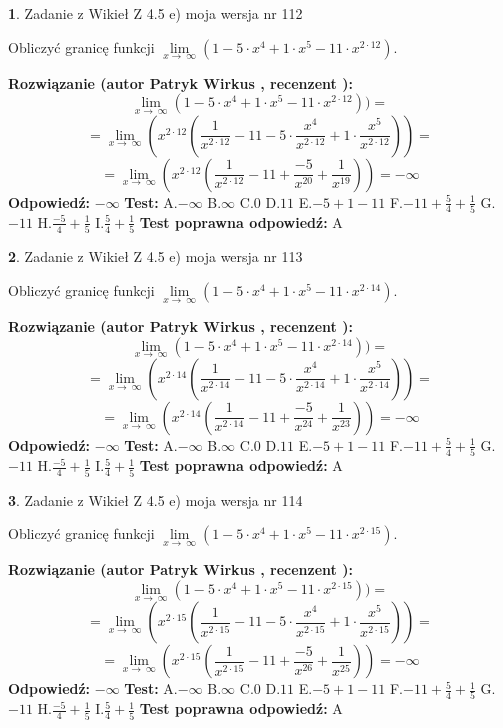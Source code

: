 \documentclass[12pt, a4paper]{article}
\theoremstyle{definition} %
\newtheorem{zad}{}
\newcommand{\zadStart}[1]{\begin{zad}#1\newline}
\newcommand{\zadStop}{\end{zad}}
\newcommand{\rozwStart}[2]{\noindent \textbf{Rozwiązanie (autor #1 , recenzent #2): }\newline}
\newcommand{\rozwStop}{\newline}
\newcommand{\odpStart}{\noindent \textbf{Odpowiedź:}\newline}
\newcommand{\odpStop}{\newline}
\newcommand{\testStart}{\noindent \textbf{Test:}\newline}
\newcommand{\testStop}{\newline}
\newcommand{\kluczStart}{\noindent \textbf{Test poprawna odpowiedź:}\newline}
\newcommand{\kluczStop}{\newline}
\begin{document}
\zadStart{Zadanie z Wikieł Z 4.5 e) moja wersja nr 112}



Obliczyć granicę funkcji  $\lim\limits_{x\to\ \infty}(1 - 5 \cdot x^{4}+1 \cdot x^{5}- 11 \cdot x^{2\cdot12})$.
\zadStop
\rozwStart{Patryk Wirkus}{}
$$\lim\limits_{x\to\ \infty}(1 - 5 \cdot x^{4}+1 \cdot x^{5}- 11 \cdot x^{2\cdot12}))=$$
$$=\lim\limits_{x\to\ \infty}(x^{2\cdot12}(\frac{1}{x^{2\cdot12}}-11 -5 \cdot \frac{x^{4}}{x^{2\cdot12}}+1 \cdot \frac{x^{5}}{x^{2\cdot12}}))=$$
$$=\lim\limits_{x\to\ \infty}(x^{2\cdot12}(\frac{1}{x^{2\cdot12}}-11 + \frac{-5}{x^{20}}+ \frac{1}{x^{19}}))=-\infty$$
\rozwStop
\odpStart
$-\infty$
\odpStop
\testStart
A.$-\infty$ B.$\infty$ C.$0$ D.$11$ E.$-5 + 1 - 11$
F.$-11+\frac{5}{4}+\frac{1}{5}$ G.$-11$
H.$\frac{-5}{4}+\frac{1}{5}$
I.$\frac{5}{4}+\frac{1}{5}$
\testStop
\kluczStart
A
\kluczStop



\zadStart{Zadanie z Wikieł Z 4.5 e) moja wersja nr 113}



Obliczyć granicę funkcji  $\lim\limits_{x\to\ \infty}(1 - 5 \cdot x^{4}+1 \cdot x^{5}- 11 \cdot x^{2\cdot14})$.
\zadStop
\rozwStart{Patryk Wirkus}{}
$$\lim\limits_{x\to\ \infty}(1 - 5 \cdot x^{4}+1 \cdot x^{5}- 11 \cdot x^{2\cdot14}))=$$
$$=\lim\limits_{x\to\ \infty}(x^{2\cdot14}(\frac{1}{x^{2\cdot14}}-11 -5 \cdot \frac{x^{4}}{x^{2\cdot14}}+1 \cdot \frac{x^{5}}{x^{2\cdot14}}))=$$
$$=\lim\limits_{x\to\ \infty}(x^{2\cdot14}(\frac{1}{x^{2\cdot14}}-11 + \frac{-5}{x^{24}}+ \frac{1}{x^{23}}))=-\infty$$
\rozwStop
\odpStart
$-\infty$
\odpStop
\testStart
A.$-\infty$ B.$\infty$ C.$0$ D.$11$ E.$-5 + 1 - 11$
F.$-11+\frac{5}{4}+\frac{1}{5}$ G.$-11$
H.$\frac{-5}{4}+\frac{1}{5}$
I.$\frac{5}{4}+\frac{1}{5}$
\testStop
\kluczStart
A
\kluczStop



\zadStart{Zadanie z Wikieł Z 4.5 e) moja wersja nr 114}



Obliczyć granicę funkcji  $\lim\limits_{x\to\ \infty}(1 - 5 \cdot x^{4}+1 \cdot x^{5}- 11 \cdot x^{2\cdot15})$.
\zadStop
\rozwStart{Patryk Wirkus}{}
$$\lim\limits_{x\to\ \infty}(1 - 5 \cdot x^{4}+1 \cdot x^{5}- 11 \cdot x^{2\cdot15}))=$$
$$=\lim\limits_{x\to\ \infty}(x^{2\cdot15}(\frac{1}{x^{2\cdot15}}-11 -5 \cdot \frac{x^{4}}{x^{2\cdot15}}+1 \cdot \frac{x^{5}}{x^{2\cdot15}}))=$$
$$=\lim\limits_{x\to\ \infty}(x^{2\cdot15}(\frac{1}{x^{2\cdot15}}-11 + \frac{-5}{x^{26}}+ \frac{1}{x^{25}}))=-\infty$$
\rozwStop
\odpStart
$-\infty$
\odpStop
\testStart
A.$-\infty$ B.$\infty$ C.$0$ D.$11$ E.$-5 + 1 - 11$
F.$-11+\frac{5}{4}+\frac{1}{5}$ G.$-11$
H.$\frac{-5}{4}+\frac{1}{5}$
I.$\frac{5}{4}+\frac{1}{5}$
\testStop
\kluczStart
A
\kluczStop
\end{document}
